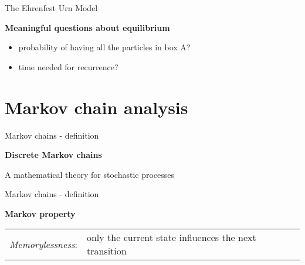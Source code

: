 \documentclass[usenames,dvipsnames]{beamer}
\begin{document}
  \begin{frame}{The Ehrenfest Urn Model}
    \begin{center}
      \textbf{Meaningful questions about equilibrium}
    \end{center}
    \begin{itemize}
      \item probability of having all the particles in box A?
    \end{itemize}
    \begin{figure}
      
    \end{figure}
    \begin{itemize}
      \item time needed for recurrence?
    \end{itemize}
    \begin{figure}
      
    \end{figure}
  \end{frame}

  \section{Markov chain analysis}
  \begin{frame}{Markov chains - definition}
    \begin{center}
      \textbf{Discrete Markov chains}
    \end{center}
    A mathematical theory for stochastic processes
    \begin{figure}
      
    \end{figure}
  \end{frame}

  \begin{frame}{Markov chains - definition}
    \begin{center}
      \textbf{Markov property}
    \end{center}
    \begin{table}
      \begin{tabularx}{\textwidth}{c >{\raggedright}X}
        \alert{\emph{Memorylessness}}: & only the current state influences the next transition \tabularnewline
      \end{tabularx}
    \end{table}
  \end{frame}

  
\end{document}
